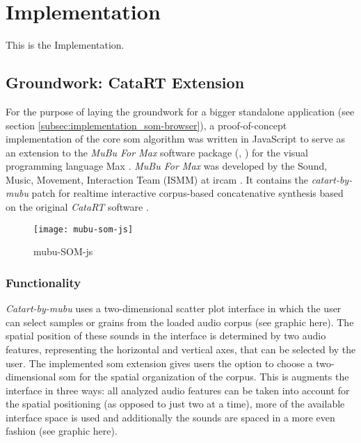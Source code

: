 
\section{Implementation}
\label{sec:implementation}
This is the Implementation.

\subsection{Groundwork: CataRT Extension}
\label{subsec:implementation_catart}
For the purpose of laying the groundwork for a bigger standalone application
(see section \ref{subsec:implementation_som-browser}), a proof-of-concept
implementation of the core \gls{som} algorithm was written in JavaScript to
serve as an extension to the \textit{MuBu For Max} software package
(\citet{web:mubu2019}, \citet{web:mubu2019_2}) for the visual programming
language Max \citep{web:max2019}. \textit{MuBu For Max} was developed by the
Sound, Music, Movement, Interaction Team (ISMM) at \gls{ircam}
\citep{schnell2009}. It contains the \textit{catart-by-mubu} patch for
realtime interactive corpus-based concatenative synthesis based on the original
\textit{CataRT} software \citep{schwarz2006}.


\begin{figure}[!htb]
  \centering
  \texttt{[image: mubu-som-js]}
  \caption{mubu-SOM-js}
  \label{fig:mubu-som}
\end{figure}

\subsubsection{Functionality}
\label{subsubec:mubu-som_functionality}
\textit{Catart-by-mubu} uses a
two-dimensional scatter plot interface in which the user can select samples or
grains from the loaded audio corpus (see
graphic here).
The spatial position of these sounds in the interface is determined by two audio
features, representing the horizontal and vertical axes, that can be selected by
the user.
The implemented \gls{som} extension gives users the option to choose a
two-dimensional \gls{som} for the spatial organization of the corpus. This is
augments the interface in three ways: all analyzed audio features can be
taken into account for the spatial positioning (as opposed to just two at a
time), more of the available interface space is used and additionally the sounds
are spaced in a more even fashion (see
graphic here).

